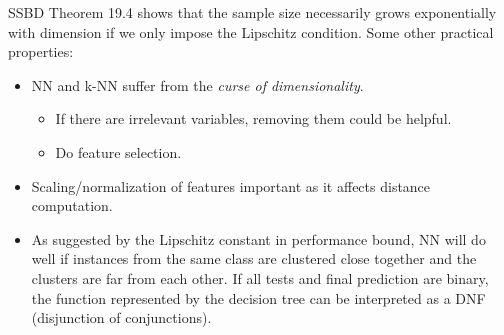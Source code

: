 \documentclass{article}
\begin{document}
   SSBD Theorem 19.4 shows that the sample size necessarily grows exponentially with dimension if we only impose the Lipschitz condition. Some other practical properties:
   \begin{itemize}
   \item NN and k-NN suffer from the \textit{curse of dimensionality}.
     \begin{itemize}
     \item If there are irrelevant variables, removing them could be helpful.
     \item Do feature selection.
     \end{itemize}
   \item Scaling/normalization of features important as it affects distance computation.
  	\item As suggested by the Lipschitz constant in performance bound, NN will do well if instances from the same class are clustered close together and the clusters are far from each other. If all tests and final prediction are binary, the function represented by the decision tree can be interpreted as a DNF (disjunction of conjunctions).
   \end{itemize}
   
   
\end{document}
